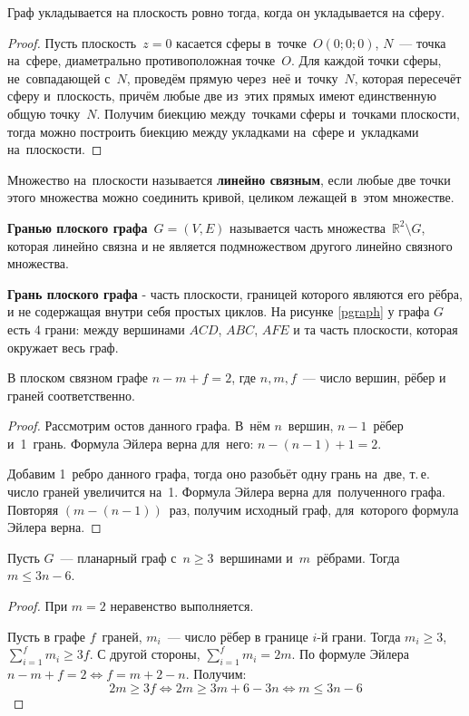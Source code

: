 \begin{theorem}
Граф укладывается на плоскость ровно тогда, когда он укладывается на сферу.
\end{theorem}
\begin{proof}
Пусть плоскость~$z = 0$ касается сферы в~точке~$O(0; 0; 0)$, $N$~--- точка на~сфере, диаметрально противоположная точке~$O$.
Для каждой точки сферы, не~совпадающей с~$N$, проведём прямую через~неё и~точку~$N$, которая пересечёт сферу и~плоскость, причём любые две из~этих прямых имеют единственную общую точку~$N$.
Получим биекцию между~точками сферы и~точками плоскости, тогда можно построить биекцию между укладками на~сфере и~укладками на~плоскости.
\end{proof}

Множество на~плоскости называется \textbf{линейно связным}, если любые две точки этого множества можно соединить кривой, целиком лежащей в~этом множестве.

\textbf{Гранью плоского графа}~$G = (V, E)$ называется часть множества~$\mathbb R^2 \setminus G$, которая линейно связна и не является подмножеством другого линейно связного множества.

\textbf{Грань плоского графа} - часть плоскости, границей которого являются его рёбра, и не содержащая внутри себя простых циклов. На рисунке \ref{pgraph} у графа $G$ есть 4 грани: между вершинами $ACD$, $ABC$, $AFE$ и та часть плоскости, которая окружает весь граф.

\begin{theorem}
	В плоском связном графе $n - m + f = 2$, где $n, m, f$~--- число вершин, рёбер и граней соответственно.
\end{theorem}
\begin{proof}
	Рассмотрим остов данного графа.
	В~нём $n$~вершин, $n - 1$~рёбер и~1~грань.
	Формула Эйлера верна для~него: $n - (n - 1) + 1 = 2$.
	
	Добавим 1~ребро данного графа, тогда оно разобьёт одну грань на~две, т.\,е. число граней увеличится на~1.
	Формула Эйлера верна для~полученного графа.
	Повторяя $(m - (n - 1))$~раз, получим исходный граф, для~которого формула Эйлера верна.
\end{proof}

\begin{theorem}
	Пусть $G$~--- планарный граф с~$n \geqslant 3$~вершинами и~$m$~рёбрами. Тогда $m \leqslant 3n - 6$.
\end{theorem}
\begin{proof}
	При $m = 2$ неравенство выполняется.
	
	Пусть в графе $f$~граней, $m_i$~--- число рёбер в границе $i$\nobreakdash-й грани.
	Тогда $m_i \geqslant 3$, $\displaystyle \sum_{i=1}^f m_i \geqslant 3f$.
	С другой стороны, $\displaystyle \sum_{i=1}^f m_i = 2m$.
	По формуле Эйлера $n - m + f = 2 \Leftrightarrow f = m + 2 - n$.
	Получим:
	\begin{equation*}
	2m \geqslant 3f \Leftrightarrow 2m \geqslant 3m + 6 - 3n \Leftrightarrow m \leqslant 3n - 6
	\end{equation*}
\end{proof}

